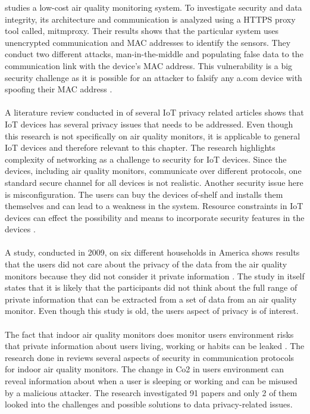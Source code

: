 \cite{SecurityAndDataIntInAQM} studies a low-cost air quality monitoring system. To investigate security and data integrity, its architecture and communication is analyzed using a HTTPS proxy tool called, mitmproxy. Their results shows that the particular system uses unencrypted communication and MAC addresses to identify the sensors. They conduct two different attacks, man-in-the-middle and populating false data to the communication link with the device's MAC address. This vulnerability is a big security challenge as it is possible for an attacker to falsify any a.com device with spoofing their MAC address \cite{SecurityAndDataIntInAQM}.
\\\\
A literature review conducted in \cite{PrivacyOnGeneralIoT} of several IoT privacy related articles shows that IoT devices has several privacy issues that needs to be addressed. Even though this research is not specifically on air quality monitors, it is applicable to general IoT devices and therefore relevant to this chapter. The research highlights complexity of networking as a challenge to security for IoT devices. Since the devices, including air quality monitors, communicate over different protocols, one standard secure channel for all devices is not realistic. Another security issue here is misconfiguration. The users can buy the devices of-shelf and installs them themselves and can lead to a weakness in the system. Resource constraints in IoT devices can effect the possibility and means to incorporate security features in the devices \cite{PrivacyOnGeneralIoT}.
\\\\
A study, conducted in 2009, on six different households in America shows results that the users did not care about the privacy of the data from the air quality monitors because they did not consider it private information \cite{inAirPrivacy}. The study in itself states that it is likely that the participants did not think about the full range of private information that can be extracted from a set of data from an air quality monitor. Even though this study is old, the users aspect of privacy is of interest.
\\\\
The fact that indoor air quality monitors does monitor users environment risks that private information about users living, working or habits can be leaked \cite{IAQMonitorCommunicationReview}. The research done in \cite{IAQMonitorCommunicationReview} reviews several aspects of security in communication protocols for indoor air quality monitors. The change in Co2 in users environment can reveal information about when a user is sleeping or working and can be misused by a malicious attacker. The research investigated 91 papers and only 2 of them looked into the challenges and possible solutions to data privacy-related issues.  
